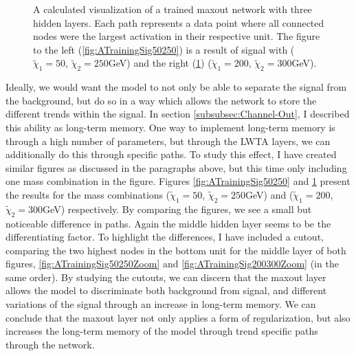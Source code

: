 \begin{figure}
{\begin{subfigure}{.6\textwidth}
        \caption{}
        \label{fig:ATrainingSig200300}
    \end{subfigure}
    }
    \caption[A calculated visualization of the activation of a three layer maxout network, after training and displaying the
    the results for two signal with each their own mass combination.]{A calculated visualization of a trained maxout network 
    with three hidden layers. Each path represents a data point where all connected nodes were the largest activation in their respective 
    unit. The figure to the left (\ref{fig:ATrainingSig50250}) is a result of signal with 
    ($\tilde{\chi}_1=50$, $\tilde{\chi}_2=250$GeV) and the right (\ref{fig:ATrainingSig200300}) 
    ($\tilde{\chi}_1=200$, $\tilde{\chi}_2=300$GeV).}
    \label{fig:NetVisSigComp}
\end{figure}
Ideally, we would want the model to not only be able to separate the signal from the background, but do so in 
a way which allows the network to store the different trends within the signal. In section \ref{subsubsec:Channel-Out},
I described this ability as long-term memory. One way to implement long-term memory is through a high number of parameters,
but through the \ac{LWTA} layers, we can additionally do this through specific paths. To study this effect, I have created similar 
figures as discussed in the paragraphs above, but this time only including one mass combination in the figure. Figures
\ref{fig:ATrainingSig50250} and \ref{fig:ATrainingSig200300} present the results for the mass combinations 
($\tilde{\chi}_1=50$, $\tilde{\chi}_2=250$GeV) and ($\tilde{\chi}_1=200$, $\tilde{\chi}_2=300$GeV) respectively.
By comparing the figures, we see a small but noticeable difference in paths. Again the middle hidden layer seems to be 
the differentiating factor. To highlight the differences, I have included a cutout, comparing the two highest nodes in the bottom unit 
for the middle layer of both figures, \ref{fig:ATrainingSig50250Zoom} and \ref{fig:ATrainingSig200300Zoom} (in the same order).
By studying the cutouts, we can discern that the maxout layer allows the model to discriminate both background from signal, 
and different variations of the signal through an increase in long-term memory. We can conclude that the maxout layer not only 
applies a form of regularization, but also increases the long-term memory of the model through trend specific paths through the network.\\
